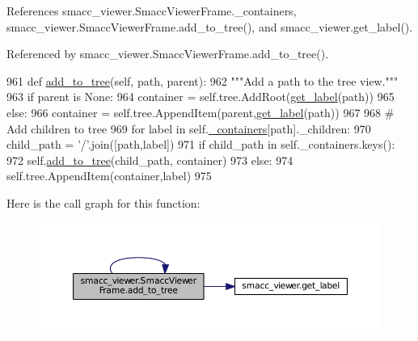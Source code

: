 References smacc\+\_\+viewer.\+Smacc\+Viewer\+Frame.\+\_\+containers, smacc\+\_\+viewer.\+Smacc\+Viewer\+Frame.\+add\+\_\+to\+\_\+tree(), and smacc\+\_\+viewer.\+get\+\_\+label().



Referenced by smacc\+\_\+viewer.\+Smacc\+Viewer\+Frame.\+add\+\_\+to\+\_\+tree().


\begin{DoxyCode}
961     \textcolor{keyword}{def }\hyperlink{classsmacc__viewer_1_1SmaccViewerFrame_a3ddd810ff5821fd93f52c4762bd0d151}{add\_to\_tree}(self, path, parent):
962         \textcolor{stringliteral}{"""Add a path to the tree view."""}
963         \textcolor{keywordflow}{if} parent \textcolor{keywordflow}{is} \textcolor{keywordtype}{None}:
964             container = self.tree.AddRoot(\hyperlink{namespacesmacc__viewer_ab45ec4827eaa89c42f52c3a2d06871cb}{get\_label}(path))
965         \textcolor{keywordflow}{else}:
966             container = self.tree.AppendItem(parent,\hyperlink{namespacesmacc__viewer_ab45ec4827eaa89c42f52c3a2d06871cb}{get\_label}(path))
967 
968         \textcolor{comment}{# Add children to tree}
969         \textcolor{keywordflow}{for} label \textcolor{keywordflow}{in} self.\hyperlink{classsmacc__viewer_1_1SmaccViewerFrame_a00ea07c6cc068340230dcac273ad5e90}{\_containers}[path].\_children:
970             child\_path = \textcolor{stringliteral}{'/'}.join([path,label])
971             \textcolor{keywordflow}{if} child\_path \textcolor{keywordflow}{in} self.\_containers.keys():
972                 self.\hyperlink{classsmacc__viewer_1_1SmaccViewerFrame_a3ddd810ff5821fd93f52c4762bd0d151}{add\_to\_tree}(child\_path, container)
973             \textcolor{keywordflow}{else}:
974                 self.tree.AppendItem(container,label)
975 
\end{DoxyCode}


Here is the call graph for this function\+:
\nopagebreak
\begin{figure}[H]
\begin{center}
\leavevmode
\includegraphics[width=350pt]{classsmacc__viewer_1_1SmaccViewerFrame_a3ddd810ff5821fd93f52c4762bd0d151_cgraph}
\end{center}
\end{figure}




